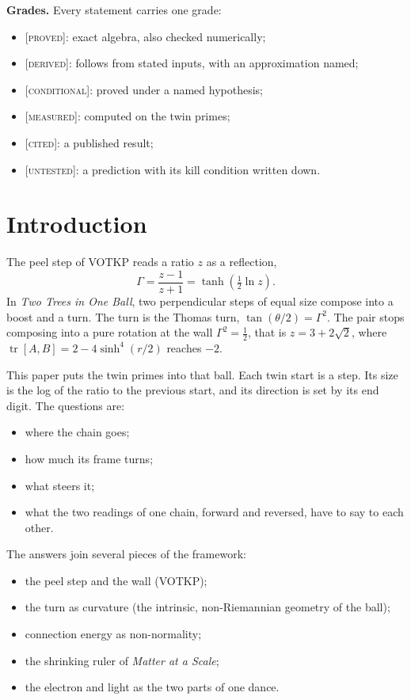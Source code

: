 \documentclass[11pt]{article}
\theoremstyle{definition}
\theoremstyle{remark}
\newcommand{\grade}[1]{\textsc{[#1]}}
\begin{document}
\tableofcontents
\bigskip

\noindent\textbf{Grades.} Every statement carries one grade:
\begin{itemize}
\item \grade{proved}: exact algebra, also checked numerically;
\item \grade{derived}: follows from stated inputs, with an approximation named;
\item \grade{conditional}: proved under a named hypothesis;
\item \grade{measured}: computed on the twin primes;
\item \grade{cited}: a published result;
\item \grade{untested}: a prediction with its kill condition written down.
\end{itemize}

\section{Introduction}

The peel step of VOTKP reads a ratio $z$ as a reflection,
\[
\Gamma=\frac{z-1}{z+1}=\tanh\!\left(\tfrac12\ln z\right).
\]
In \emph{Two Trees in One Ball}, two perpendicular steps of equal size compose into a boost and a turn. The turn is the Thomas turn, $\tan(\theta/2)=\Gamma^2$. The pair stops composing into a pure rotation at the wall $\Gamma^2=\tfrac12$, that is $z=3+2\sqrt2$, where $\operatorname{tr}[A,B]=2-4\sinh^4(r/2)$ reaches $-2$.

This paper puts the twin primes into that ball. Each twin start is a step. Its size is the log of the ratio to the previous start, and its direction is set by its end digit. The questions are:
\begin{itemize}
\item where the chain goes;
\item how much its frame turns;
\item what steers it;
\item what the two readings of one chain, forward and reversed, have to say to each other.
\end{itemize}

The answers join several pieces of the framework:
\begin{itemize}
\item the peel step and the wall (VOTKP);
\item the turn as curvature (the intrinsic, non-Riemannian geometry of the ball);
\item connection energy as non-normality;
\item the shrinking ruler of \emph{Matter at a Scale};
\item the electron and light as the two parts of one dance.
\end{itemize}
\end{document}
